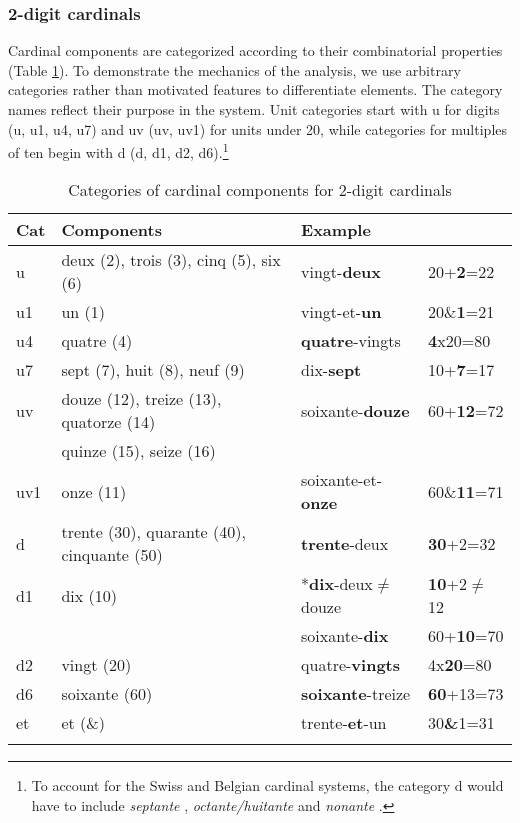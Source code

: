\documentclass[output=paper]{langsci/langscibook}
\begin{document}
\subsubsection{2-digit cardinals}

Cardinal components are categorized according to their combinatorial properties (Table \ref{2D-Cat}). To demonstrate the mechanics of the analysis, we use arbitrary categories rather than motivated features to differentiate elements. The category names reflect their purpose in the system. Unit categories start with u for digits (u, u1, u4, u7) and uv (uv, uv1) for units under 20, while categories for multiples of ten begin with d (d, d1, d2, d6).\footnote{To account for the Swiss and Belgian cardinal systems, the category d would have to include \emph{septante} , \emph{octante/huitante}  and \emph{nonante} .}

\begin{savenotes}
\begin{table}
\begin{tabular}{llll}
 \lsptoprule
 Cat  & Components & Example \\
 \midrule 
 u & deux (2), trois (3), cinq (5), six (6) & vingt-\textbf{deux} &20+\textbf{2}=22\\
 u1 & un (1) & vingt-et-\textbf{un} &20\&\textbf{1}=21\\
 u4 & quatre (4)& \textbf{quatre}-vingts &\textbf{4}x20=80\\
 u7 & sept (7), huit (8), neuf (9)&dix-\textbf{sept} &10+\textbf{7}=17\\
 \midrule
 uv & douze (12), treize (13), quatorze (14) & soixante-\textbf{douze} &60+\textbf{12}=72\\
 & quinze (15), seize (16) & \\
uv1 & onze (11)& soixante-et-\textbf{onze} &60\&\textbf{11}=71 \\
\midrule
 d & trente (30), quarante (40), cinquante (50) & \textbf{trente}-deux &\textbf{30}+2=32 \\
 d1 & dix (10)& *\textbf{dix}-deux$\neq$douze &\textbf{10}+2$\neq$12 \\
      &             & soixante-\textbf{dix} &60+\textbf{10}=70 \\
 d2 & vingt (20)&quatre-\textbf{vingts} &4x\textbf{20}=80\\
 d6 & soixante (60) & \textbf{soixante}-treize &\textbf{60}+13=73\\
\midrule
 et & et (\&) & trente-\textbf{et}-un &30\textbf{\&}1=31\\
\lspbottomrule
\end{tabular}
\caption{Categories of cardinal components for 2-digit cardinals}\label{2D-Cat}
\end{table}
\end{savenotes}
\end{document}
